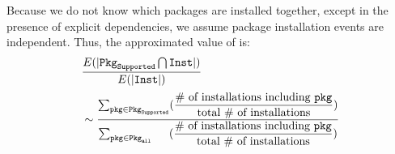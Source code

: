 Because we do not know which packages are installed together,
except in the presence of explicit dependencies,
we assume package installation events are independent.
Thus, the approximated value of \compatmetric{} is:
\begin{align*}
&\frac{E(|\mathtt{Pkg}_\mathtt{Supported} \bigcap \mathtt{Inst}|)}{E(|\mathtt{Inst}|)} \\[0.5ex]
&\sim \dfrac{\sum_{\mathtt{pkg} \in \mathtt{Pkg}_\mathtt{Supported}} (\dfrac{\text{\# of installations including $\mathtt{pkg}$}}{\text{total \# of installations}})}{\sum_{\mathtt{pkg} \in \mathtt{Pkg}_\mathtt{all\hspace{0.21in}}} (\dfrac{\text{\# of installations including $\mathtt{pkg}$}}{\text{total \# of installations}})}
\end{align*}
